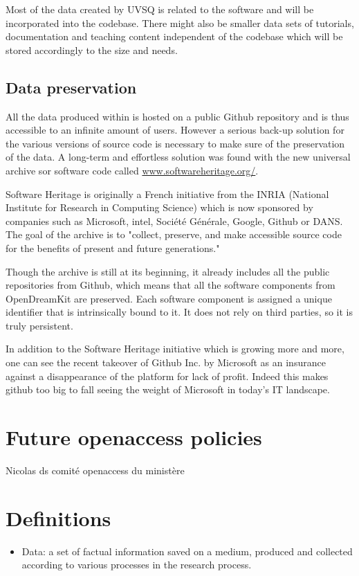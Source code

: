 \documentclass{deliverablereport}
\begin{document}
\begin{enumerate}
\begin{itemize}
Most of the data created by UVSQ is related to the software \Sage and will be incorporated into the \Sage codebase. There might also be smaller data sets of tutorials, documentation and teaching content independent of the \Sage codebase which will be stored accordingly to the size and needs.
\end{itemize}
\end{enumerate}

\subsection{Data preservation}

All the data produced within \ODK is hosted on a public Github repository and is thus accessible to an infinite amount of users. However a serious back-up solution for the various versions of source code is necessary to make sure of the preservation of the data.
A long-term and effortless solution was found with the new universal archive sor software code called \href{https://www.softwareheritage.org/}{www.softwareheritage.org/}.

Software Heritage is originally a French initiative from the INRIA (National Institute for Research in Computing Science) which is now sponsored by companies such as Microsoft, intel, Société Générale, Google, Github or DANS. The goal of the archive is to "collect, preserve, and make accessible source code for the benefits of present and future generations."

Though the archive is still at its beginning, it already includes all the public repositories from Github, which means that all the software components from OpenDreamKit are preserved. Each software component is assigned a unique identifier that is intrinsically bound to it. It does not rely on third parties, so it is truly persistent.

In addition to the Software Heritage initiative which is growing more and more, one can see the recent takeover of Github Inc. by Microsoft as an insurance against a disappearance of the platform for lack of profit. Indeed this makes github too big to fall seeing the weight of Microsoft in today's IT landscape.


\section{Future openaccess policies}

Nicolas ds comité openaccess du ministère


\section{Definitions}

\begin{itemize}
\item{Data:} a set of factual information saved on a medium, produced and collected according to various processes in the research process.
\end{itemize}
\end{document}
